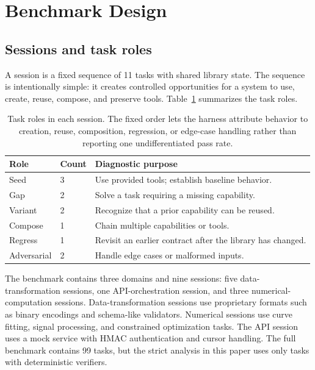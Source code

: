 \documentclass[sigconf,anonymous,natbib=false]{acmart}
\begin{document}
\section{Benchmark Design}

\subsection{Sessions and task roles}

A session is a fixed sequence of 11 tasks with shared library state. The sequence is intentionally simple: it creates controlled opportunities for a system to use, create, reuse, compose, and preserve tools. Table~\ref{tab:task-types} summarizes the task roles.

\begin{table}[t]
\centering
\small
\caption{Task roles in each session. The fixed order lets the harness attribute behavior to creation, reuse, composition, regression, or edge-case handling rather than reporting one undifferentiated pass rate.}
\label{tab:task-types}
\begin{tabular}{llp{4.5cm}}
\toprule
\textbf{Role} & \textbf{Count} & \textbf{Diagnostic purpose} \\
\midrule
Seed & 3 & Use provided tools; establish baseline behavior. \\
Gap & 2 & Solve a task requiring a missing capability. \\
Variant & 2 & Recognize that a prior capability can be reused. \\
Compose & 1 & Chain multiple capabilities or tools. \\
Regress & 1 & Revisit an earlier contract after the library has changed. \\
Adversarial & 2 & Handle edge cases or malformed inputs. \\
\bottomrule
\end{tabular}
\end{table}

The benchmark contains three domains and nine sessions: five data-transformation sessions, one API-orchestration session, and three numerical-computation sessions. Data-transformation sessions use proprietary formats such as binary encodings and schema-like validators. Numerical sessions use curve fitting, signal processing, and constrained optimization tasks. The API session uses a mock service with HMAC authentication and cursor handling. The full benchmark contains 99 tasks, but the strict analysis in this paper uses only tasks with deterministic verifiers.
\end{document}
